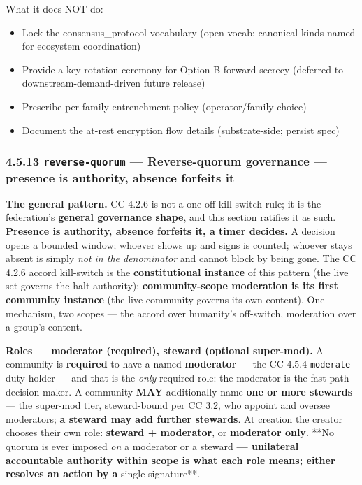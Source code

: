 \documentclass[11pt]{article}
\begin{document}
What it does NOT do:

\begin{itemize}\setlength\itemsep{0pt}
\item Lock the consensus\_protocol vocabulary (open vocab; canonical kinds named for ecosystem coordination)
\item Provide a key-rotation ceremony for Option B forward secrecy (deferred to downstream-demand-driven future release)
\item Prescribe per-family entrenchment policy (operator/family choice)
\item Document the at-rest encryption flow details (substrate-side; persist spec)
\end{itemize}


\subsubsection*{4.5.13 \texttt{reverse-quorum} — Reverse-quorum governance — presence is authority, absence forfeits it}


\textbf{The general pattern.} CC 4.2.6 is not a one-off kill-switch rule; it is the federation's \textbf{general governance shape}, and this section ratifies it as such. \textbf{Presence is authority, absence forfeits it, a timer decides.} A decision opens a bounded window; whoever shows up and signs is counted; whoever stays absent is simply \textit{not in the denominator} and cannot block by being gone. The CC 4.2.6 accord kill-switch is the \textbf{constitutional instance} of this pattern (the live set governs the halt-authority); \textbf{community-scope moderation is its first community instance} (the live community governs its own content). One mechanism, two scopes — the accord over humanity's off-switch, moderation over a group's content.


\textbf{Roles — moderator (required), steward (optional super-mod).} A community is \textbf{required} to have a named \textbf{moderator} — the CC 4.5.4 \texttt{moderate}-duty holder — and that is the \textit{only} required role: the moderator is the fast-path decision-maker. A community \textbf{MAY} additionally name \textbf{one or more stewards} — the super-mod tier, steward-bound per CC 3.2, who appoint and oversee moderators; \textbf{a steward may add further stewards}. At creation the creator chooses their own role: \textbf{steward + moderator}, or \textbf{moderator only}. **No quorum is ever imposed \textit{on} a moderator or a steward\textbf{ — unilateral accountable authority within scope is what each role means; either resolves an action by a }single signature**.
\end{document}
